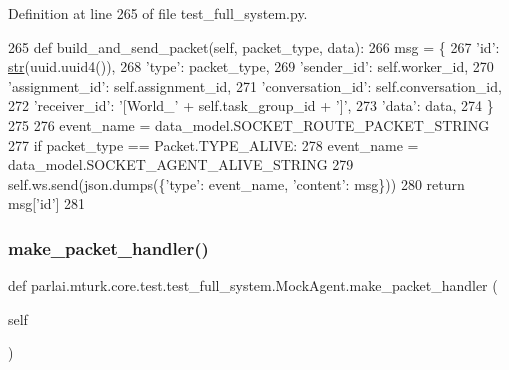 Definition at line 265 of file test\+\_\+full\+\_\+system.\+py.


\begin{DoxyCode}
265     \textcolor{keyword}{def }build\_and\_send\_packet(self, packet\_type, data):
266         msg = \{
267             \textcolor{stringliteral}{'id'}: \hyperlink{namespacegenerate__task__READMEs_a5b88452ffb87b78c8c85ececebafc09f}{str}(uuid.uuid4()),
268             \textcolor{stringliteral}{'type'}: packet\_type,
269             \textcolor{stringliteral}{'sender\_id'}: self.worker\_id,
270             \textcolor{stringliteral}{'assignment\_id'}: self.assignment\_id,
271             \textcolor{stringliteral}{'conversation\_id'}: self.conversation\_id,
272             \textcolor{stringliteral}{'receiver\_id'}: \textcolor{stringliteral}{'[World\_'} + self.task\_group\_id + \textcolor{stringliteral}{']'},
273             \textcolor{stringliteral}{'data'}: data,
274         \}
275 
276         event\_name = data\_model.SOCKET\_ROUTE\_PACKET\_STRING
277         \textcolor{keywordflow}{if} packet\_type == Packet.TYPE\_ALIVE:
278             event\_name = data\_model.SOCKET\_AGENT\_ALIVE\_STRING
279         self.ws.send(json.dumps(\{\textcolor{stringliteral}{'type'}: event\_name, \textcolor{stringliteral}{'content'}: msg\}))
280         \textcolor{keywordflow}{return} msg[\textcolor{stringliteral}{'id'}]
281 
\end{DoxyCode}
\mbox{\label{classparlai_1_1mturk_1_1core_1_1test_1_1test__full__system_1_1MockAgent_a872f69350ed59fcccfa5819f2bd65337}} 
\subsubsection{\texorpdfstring{make\+\_\+packet\+\_\+handler()}{make\_packet\_handler()}}
{\footnotesize\ttfamily def parlai.\+mturk.\+core.\+test.\+test\+\_\+full\+\_\+system.\+Mock\+Agent.\+make\+\_\+packet\+\_\+handler (\begin{DoxyParamCaption}\item[{}]{self }\end{DoxyParamCaption})}

